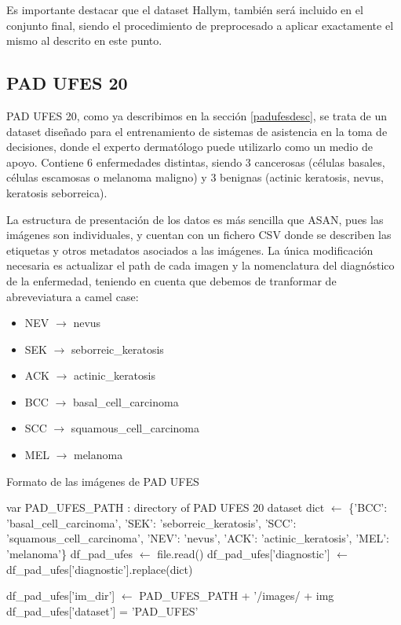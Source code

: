 Es importante destacar que el dataset Hallym, también será incluido en el conjunto final, siendo el procedimiento de preprocesado a aplicar exactamente el mismo al descrito en este punto.

\subsection{PAD UFES 20}

PAD UFES 20, como ya describimos en la sección \ref{padufesdesc}, se trata de un dataset diseñado para el entrenamiento de sistemas de asistencia en la toma de decisiones, donde el experto dermatólogo puede utilizarlo como un medio de apoyo. Contiene 6 enfermedades distintas, siendo 3 cancerosas (células basales, células escamosas o melanoma maligno) y 3 benignas (actinic keratosis, nevus, keratosis seborreica).

La estructura de presentación de los datos es más sencilla que ASAN, pues las imágenes son individuales, y cuentan con un fichero CSV donde se describen las etiquetas y otros metadatos asociados a las imágenes. La única modificación necesaria es actualizar el path de cada imagen y la nomenclatura del diagnóstico de la enfermedad, teniendo en cuenta que debemos de tranformar de abreveviatura a camel case:
\begin{itemize}
	\item NEV $\rightarrow$ nevus
	\item SEK  $\rightarrow$ seborreic\_keratosis 
	\item ACK $\rightarrow$ actinic\_keratosis  
	\item BCC $\rightarrow$  basal\_cell\_carcinoma           
	\item SCC $\rightarrow$ squamous\_cell\_carcinoma
	\item MEL $\rightarrow$ melanoma
	         
\end{itemize}



\begin{algorithm}

	\caption{Formato de las imágenes de PAD UFES}
	\label{cortarpadufes}
	\begin{algorithmic}
		\State  var PAD\_UFES\_PATH : directory of PAD UFES 20 dataset
		\State dict $\gets$ \{'BCC': 'basal\_cell\_carcinoma', 'SEK': 'seborreic\_keratosis', 'SCC': 'squamous\_cell\_carcinoma', 'NEV': 'nevus',
			'ACK': 'actinic\_keratosis', 'MEL': 'melanoma'\}
		\State df\_pad\_ufes $\gets$ file.read()
		\State  df\_pad\_ufes['diagnostic'] $\gets$ df\_pad\_ufes['diagnostic'].replace(dict)
		
			\State df\_pad\_ufes['im\_dir'] $\gets$  PAD\_UFES\_PATH + '/images/ + img
		   \State df\_pad\_ufes['dataset'] = 'PAD\_UFES'
	
	\EndFor		
		\EndProcedure
	\end{algorithmic}
\end{algorithm}

